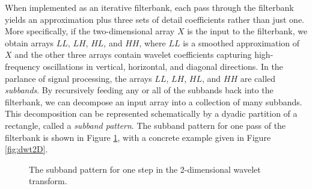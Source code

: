 When implemented as an iterative filterbank, each pass through the filterbank yields an approximation plus three sets of detail coefficients
rather than just one.
More specifically, if the two-dimensional array $X$ is the input to the filterbank, we obtain arrays $LL$, $LH$, $HL$, and $HH$,
where $LL$ is a smoothed approximation of $X$ and the other three arrays contain wavelet coefficients capturing high-frequency
oscillations in vertical, horizontal, and diagonal directions.
In the parlance of signal processing, the arrays $LL$, $LH$, $HL$, and $HH$ are called \emph{subbands}.
By recursively feeding any or all of the subbands back into the filterbank, we can decompose an input array into a collection
of many subbands.
This decomposition can be represented schematically by a dyadic partition of a rectangle, called a \emph{subband pattern}.
The subband pattern for one pass of the filterbank is shown in Figure \ref{fig:2dsubbands}, with a concrete example given in Figure \ref{fig:dwt2D}.
\begin{figure}
\caption{The subband pattern for one step in the 2-dimensional wavelet transform.}
\label{fig:2dsubbands}
\end{figure}
